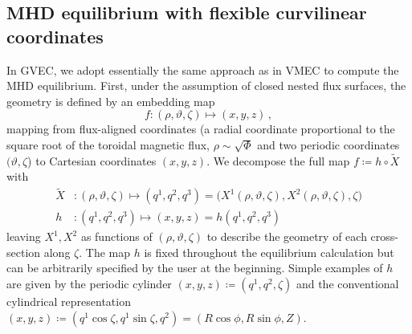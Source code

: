 \documentclass[12pt]{iopart}
\newcommand\hlchanged[1]{#1} %
\newcommand\hlchangedrev[1]{#1} %
\newcommand\hmap{{h}}
\newcommand{\thet}{\vartheta}
\begin{document}
\subsection{MHD equilibrium \hlchangedrev{with flexible curvilinear coordinates}}
In GVEC, we adopt essentially the same approach as in VMEC \cite{hirshman_VMEC_1983} to compute the MHD equilibrium. First, under the assumption of closed nested flux surfaces, the geometry is defined by an embedding map 
\begin{equation}
    f: (\rho,\thet,\zeta) \mapsto (x,y,z)\,,
\end{equation}
mapping from flux-aligned coordinates  (a radial coordinate proportional to the square root of the toroidal magnetic flux, $\rho\sim\sqrt{\Phi}$  and two periodic coordinates $(\thet,\zeta$) to Cartesian coordinates $(x,y,z)$. We decompose the full map $f\coloneqq h\circ \tilde{X}$ with
\begin{align}
    \tilde{X} &: (\rho,\thet,\zeta)\mapsto (q^1,q^2,\hlchangedrev{q^3}) = \big(X^1(\rho,\thet,\zeta),X^2(\rho,\thet,\zeta),\zeta\big) \\
	\hmap &: (q^1,q^2,\hlchangedrev{q^3}) \mapsto (x,y,z)=\hmap(q^1,q^2,\hlchangedrev{q^3})
\end{align}
leaving $X^1,X^2$ as functions of $(\rho,\thet,\zeta)$ to describe the geometry of each cross-section along $\zeta$. The map $\hmap$ is fixed throughout the equilibrium calculation but can be arbitrarily specified by the user at the beginning. Simple examples of $\hmap$ are given by the periodic cylinder $(x,y,z) \coloneqq (q^1,q^2,\zeta)$ and the conventional \hlchanged{cylindrical} representation $(x,y,z) \coloneqq (q^1 \cos\zeta,q^1 \sin\zeta,q^2) = (R\cos\phi, R\sin\phi, Z)$. 
\end{document}

